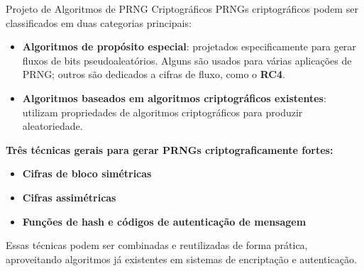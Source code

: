 \begin{frame}{Projeto de Algoritmos de PRNG Criptográficos}
    PRNGs criptográficos podem ser classificados em duas categorias principais:

    \begin{itemize}
        \item \textbf{Algoritmos de propósito especial}: projetados especificamente para gerar fluxos de bits pseudoaleatórios. Alguns são usados para várias aplicações de PRNG; outros são dedicados a cifras de fluxo, como o \textbf{RC4}.
        \item \textbf{Algoritmos baseados em algoritmos criptográficos existentes}: utilizam propriedades de algoritmos criptográficos para produzir aleatoriedade.
    \end{itemize}

    \medskip

    \textbf{Três técnicas gerais para gerar PRNGs criptograficamente fortes:}
    \begin{itemize}
        \item \textbf{Cifras de bloco simétricas}
        \item \textbf{Cifras assimétricas}
        \item \textbf{Funções de hash e códigos de autenticação de mensagem}
    \end{itemize}

    \medskip
    Essas técnicas podem ser combinadas e reutilizadas de forma prática, aproveitando algoritmos já existentes em sistemas de encriptação e autenticação.
\end{frame}



